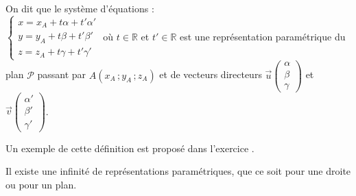 \begin{definition}
  On dit que le système d'équations :
  \\$\begin{cases}x=x_A+t\alpha+t'\alpha'
    \\y=y_A+t\beta +t'\beta' \\z=z_A+t\gamma +t'\gamma'
  \end{cases}$ où $t\in\mathbb{R}$ et
  $t'\in\mathbb{R}$
  est une représentation paramétrique du plan $\mathscr{P}$
  passant par $A(x_A\,;y_A\,;z_A)$ et de vecteurs directeurs $\vec{u}
  \begin {pmatrix} \alpha\\\beta\\\gamma \end{pmatrix}$ et
  $\vec{v} \begin {pmatrix} \alpha'\\\beta'\\\gamma' \end{pmatrix}$.
\end{definition}

\begin{remarque}
  Un exemple de cette définition est proposé dans l’exercice
  .
\end{remarque}

\begin{remarque}
  Il existe une infinité de représentations paramétriques, que ce soit
  pour une droite ou pour un plan.
\end{remarque}

